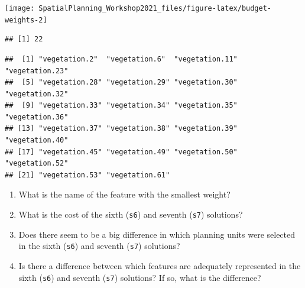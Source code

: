\documentclass[
  12pt,
]{book}
\newenvironment{Shaded}{\begin{snugshade}}{\end{snugshade}}
\newcommand{\AttributeTok}[1]{\textcolor[rgb]{0.77,0.63,0.00}{#1}}
\newcommand{\CommentTok}[1]{\textcolor[rgb]{0.56,0.35,0.01}{\textit{#1}}}
\newcommand{\ConstantTok}[1]{\textcolor[rgb]{0.00,0.00,0.00}{#1}}
\newcommand{\FloatTok}[1]{\textcolor[rgb]{0.00,0.00,0.81}{#1}}
\newcommand{\FunctionTok}[1]{\textcolor[rgb]{0.00,0.00,0.00}{#1}}
\newcommand{\NormalTok}[1]{#1}
\newcommand{\OtherTok}[1]{\textcolor[rgb]{0.56,0.35,0.01}{#1}}
\newcommand{\SpecialCharTok}[1]{\textcolor[rgb]{0.00,0.00,0.00}{#1}}
\newcommand{\StringTok}[1]{\textcolor[rgb]{0.31,0.60,0.02}{#1}}
\providecommand{\tightlist}{%
  \setlength{\itemsep}{0pt}\setlength{\parskip}{0pt}}
\begin{document}
\begin{center}\texttt{[image: SpatialPlanning\_Workshop2021\_files/figure-latex/budget-weights-2]} \end{center}

\begin{Shaded}
\end{Shaded}

\begin{verbatim}
## [1] 22
\end{verbatim}

\begin{Shaded}
\end{Shaded}

\begin{verbatim}
##  [1] "vegetation.2"  "vegetation.6"  "vegetation.11" "vegetation.23"
##  [5] "vegetation.28" "vegetation.29" "vegetation.30" "vegetation.32"
##  [9] "vegetation.33" "vegetation.34" "vegetation.35" "vegetation.36"
## [13] "vegetation.37" "vegetation.38" "vegetation.39" "vegetation.40"
## [17] "vegetation.45" "vegetation.49" "vegetation.50" "vegetation.52"
## [21] "vegetation.53" "vegetation.61"
\end{verbatim}

\begin{rmdquestion}
\begin{enumerate}
\def\labelenumi{\arabic{enumi}.}
\tightlist
\item
  What is the name of the feature with the smallest weight?
\item
  What is the cost of the sixth (\texttt{s6}) and seventh (\texttt{s7}) solutions?
\item
  Does there seem to be a big difference in which planning units were selected in the sixth (\texttt{s6}) and seventh (\texttt{s7}) solutions?
\item
  Is there a difference between which features are adequately represented in the sixth (\texttt{s6}) and seventh (\texttt{s7}) solutions? If so, what is the difference?
\end{enumerate}
\end{rmdquestion}
\end{document}
